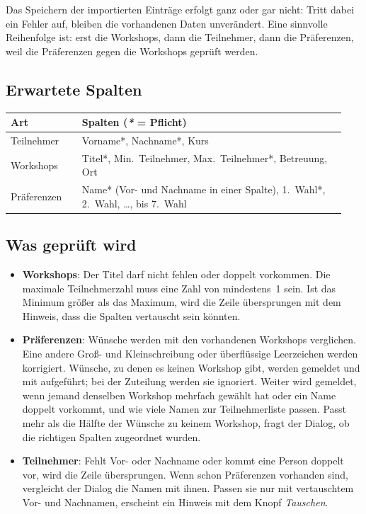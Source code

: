 \documentclass[a4paper,11pt]{article}
\begin{document}
Das Speichern der importierten Einträge erfolgt ganz oder gar nicht: Tritt dabei ein Fehler auf, bleiben die vorhandenen
Daten unverändert. Eine sinnvolle Reihenfolge ist: erst die Workshops, dann die Teilnehmer, dann die Präferenzen, weil die Präferenzen
gegen die Workshops geprüft werden.

\subsection*{Erwartete Spalten}

\begin{longtable}{@{}p{0.2\linewidth}p{0.74\linewidth}@{}}
  \toprule
  \textbf{Art} & \textbf{Spalten} (\emph{*} = Pflicht) \\
  \midrule
  \endhead
  Teilnehmer & Vorname*, Nachname*, Kurs \\
  Workshops & Titel*, Min.~Teilnehmer, Max.~Teilnehmer*, Betreuung, Ort \\
  Präferenzen & Name* (Vor- und Nachname in einer Spalte), 1.~Wahl*, 2.~Wahl, \dots, bis 7.~Wahl \\
  \bottomrule
\end{longtable}

\subsection*{Was geprüft wird}

\begin{itemize}
  \item \textbf{Workshops}: Der Titel darf nicht fehlen oder doppelt vorkommen. Die maximale Teilnehmerzahl muss eine Zahl
  von mindestens~1 sein. Ist das Minimum größer als das Maximum, wird die Zeile übersprungen mit dem Hinweis, dass die
  Spalten vertauscht sein könnten.
  \item \textbf{Präferenzen}: Wünsche werden mit den vorhandenen Workshops verglichen. Eine andere Groß- und
  Kleinschreibung oder überflüssige Leerzeichen werden korrigiert. Wünsche, zu denen es keinen Workshop gibt, werden
  gemeldet und mit aufgeführt; bei der Zuteilung werden sie ignoriert. Weiter wird gemeldet, wenn jemand denselben
  Workshop mehrfach gewählt hat oder ein Name doppelt vorkommt, und wie viele Namen zur Teilnehmerliste passen. Passt
  mehr als die Hälfte der Wünsche zu keinem Workshop, fragt der Dialog, ob die richtigen Spalten zugeordnet wurden.
  \item \textbf{Teilnehmer}: Fehlt Vor- oder Nachname oder kommt eine Person doppelt vor, wird die Zeile übersprungen.
  Wenn schon Präferenzen vorhanden sind, vergleicht der Dialog die Namen mit ihnen. Passen sie nur mit vertauschtem Vor-
  und Nachnamen, erscheint ein Hinweis mit dem Knopf \emph{Tauschen}.
\end{itemize}
\end{document}
